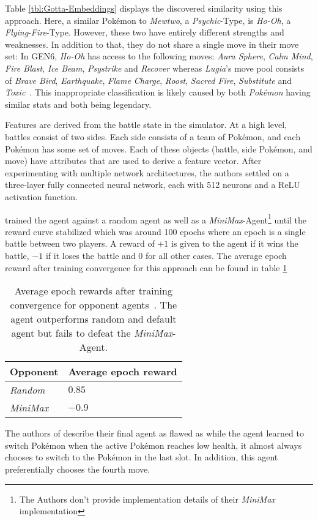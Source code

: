 Table \ref{tbl:Gotta-Embeddings} displays the discovered similarity using this approach. Here, a similar Pokémon
to \textit{Mewtwo}, a \textit{Psychic}-Type, is \textit{Ho-Oh}, a \textit{Flying}-\textit{Fire}-Type. However,
these two have entirely different strengths and weaknesses. In addition to that, they do not share a single
move in their move set: 
In \ac{GEN6}, \textit{Ho-Oh} has access to the following moves: \textit{Aura Sphere}, \textit{Calm Mind}, 
\textit{Fire Blast}, \textit{Ice Beam}, \textit{Psystrike} and \textit{Recover} whereas \textit{Lugia}'s
move pool consists of \textit{Brave Bird}, \textit{Earthquake}, \textit{Flame Charge}, \textit{Roost},
\textit{Sacred Fire}, \textit{Substitute} and \textit{Toxic}~\autocite{DamageCalc:Gen6}. This inappropriate
classification is likely caused by both \textit{Pokémon} having similar stats and both being legendary.

Features are derived from the battle state in the simulator. At a high level, battles consist of two
sides. Each side consists of a team of Pokémon, and each Pokémon has some set of moves. Each of these 
objects (battle, side Pokémon, and move) have attributes that are used to derive a feature vector.
After experimenting with multiple network architectures, the authors settled on a three-layer 
fully connected neural network, each with 512 neurons and a ReLU activation function.

\cite{GottaTrainEmAll} trained the agent against a random agent as well as a \textit{MiniMax}-Agent\footnote{The Authors don't
provide implementation details of their \textit{MiniMax} implementation}
until the reward curve stabilized which was around 100 epochs where an epoch is a single battle between
two players. A reward of $+1$ is given to the agent if it wins the battle, $-1$ if it loses the battle and
$0$ for all other cases. The average epoch reward after training convergence for this approach can
be found in table \ref{tbl:Gotta-Performance}
\begin{table}[h]
    \centering
    \caption{Average epoch rewards after training convergence for opponent agents~\autocite{GottaTrainEmAll}. The agent
    outperforms random and default agent but fails to defeat the \textit{MiniMax}-Agent.}
    \label{tbl:Gotta-Performance}
        \begin{tabular}{|l|l|}
            \hline
            Opponent & Average epoch reward \\
            \hline
            \emph{Random} & $0.85$ \\
            \hline
            \emph{MiniMax} & $-0.9$ \\
            \hline
        \end{tabular}
\end{table}
The authors of \cite{GottaTrainEmAll} describe their final agent as flawed as while the agent learned 
to switch Pokémon when the active Pokémon reaches low health, it almost always chooses to switch to the
Pokémon in the last slot. In addition, this agent preferentially chooses the fourth move. 


